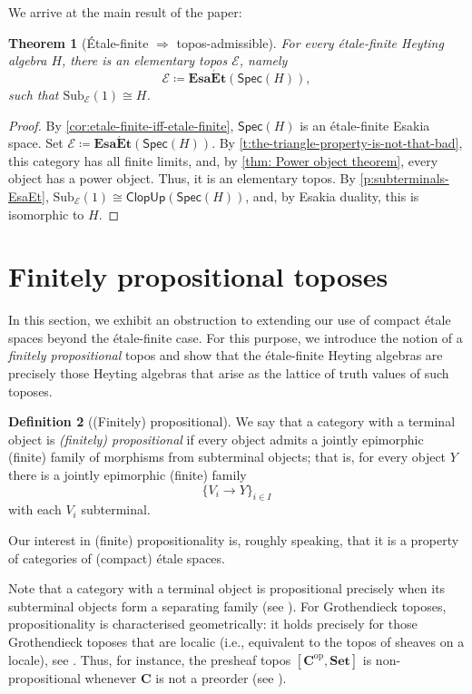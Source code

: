 \documentclass[12pt]{amsart}
\theoremstyle{plain}
\newtheorem{theorem}{Theorem}[section]
\theoremstyle{definition}
\newtheorem{definition}[theorem]{Definition}
\newcommand{\cat}[1]{\mathbf{#1}}
\newcommand{\op}{\mathrm{op}}
\newcommand{\E}{\mathcal{E}}
\newcommand{\Set}{\cat{Set}}
\newcommand{\Spec}{\mathsf{Spec}}
\newcommand{\Sub}{\mathrm{Sub}}
\newcommand{\ClopUp}{\mathsf{ClopUp}}
\newcommand{\EsaEt}{\cat{Esa\acute{E}t}}
\begin{document}
We arrive at the main result of the paper:

\begin{theorem}[\'Etale-finite $\Rightarrow$ topos-admissible] \label{thm: elementary topos from etale-finite Heyting algebra}
    For every étale-finite Heyting algebra $H$, there is an elementary topos $\E$,
    namely
    \[
    \E \coloneqq \EsaEt(\Spec(H)),
    \]
    such that $\Sub_\E(1)\cong H$.
\end{theorem}
\begin{proof}
    By \cref{cor:etale-finite-iff-etale-finite}, $\Spec(H)$ is an étale-finite Esakia space.
    Set $\E \coloneqq \EsaEt(\Spec(H))$. 
    By \cref{t:the-triangle-property-is-not-that-bad}, this category has all finite limits, and, by \cref{thm: Power object theorem}, every object has a power object. Thus, it is an elementary topos. By \cref{p:subterminals-EsaEt}, $\Sub_{\E}(1) \cong \ClopUp(\Spec(H))$, and, by Esakia duality, this is isomorphic to $H$.
\end{proof}



\section{Finitely propositional toposes} \label{sec:finitely-propositional-toposes}

In this section, we exhibit an obstruction to extending our use of compact étale spaces beyond the étale-finite case. For this purpose, we introduce the notion of a \emph{finitely propositional} topos and show that the étale-finite Heyting algebras are precisely those Heyting algebras that arise as the lattice of truth values of such toposes.



\begin{definition}[(Finitely) propositional] \label{d:finitely propositional topos}
    We say that a category with a terminal object is \emph{(finitely) propositional} if every object admits a jointly epimorphic (finite) family of morphisms from subterminal objects; that is, for every object $Y$ there is a jointly epimorphic (finite) family
    \[
    \{V_i\longrightarrow Y\}_{i\in I}
    \]
    with each $V_i$ subterminal.
\end{definition}

Our interest in (finite) propositionality is, roughly speaking, that it is a property of categories of (compact) étale spaces.

Note that a category with a terminal object is propositional precisely when its
subterminal objects form a separating family (see
\cite[p.~12]{johnstone2002sketches}). For Grothendieck toposes, propositionality is characterised geometrically: it holds precisely for those Grothendieck toposes that are localic (i.e., equivalent to the
topos of sheaves on a locale), see \cite[Thm.~C1.4.7]{johnstone2002sketches}. Thus, for instance, the
presheaf topos $[\cat{C}^{\op},\Set]$ is non-propositional whenever $\cat{C}$
is not a preorder (see \cite[Cor.~3.2]{caramello}).
\end{document}
